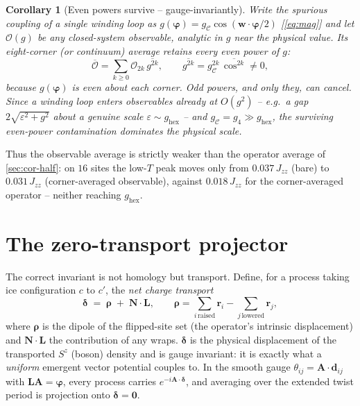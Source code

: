 \documentclass[11pt,letterpaper]{article}
\newcommand{\Jzz}{J_{zz}}
\newcommand{\bvarphi}{\bm{\varphi}}
\newcommand{\bw}{\mathbf{w}}
\newcommand{\bN}{\mathbf{N}}
\newcommand{\br}{\mathbf{r}}
\newcommand{\bL}{\mathbf{L}}
\newcommand{\brho}{\bm{\rho}}
\newcommand{\bdelta}{\bm{\delta}}
\newcommand{\gfour}{g_{4}}
\newcommand{\ghex}{g_{\mathrm{hex}}}
\theoremstyle{plain}
\newtheorem{corollary}{Corollary}
\theoremstyle{definition}
\begin{document}
\begin{corollary}[Even powers survive -- gauge-invariantly]
\label{cor:obs}
Write the spurious coupling of a single winding loop as
$g(\bvarphi)=g_{\mathcal C}\cos(\bw\cdot\bvarphi/2)$
[\cref{eq:mag}] and let $\mathcal O(g)$ be any closed-system observable,
analytic in $g$ near the physical value. Its eight-corner (or continuum)
average retains every \emph{even} power of $g$:
\begin{equation}
\overline{\mathcal O}
=\sum_{k\ge0}\mathcal O_{2k}\,\overline{g^{2k}},
\qquad \overline{g^{2k}}=g_{\mathcal C}^{2k}\,\overline{\cos^{2k}}\neq0,
\end{equation}
because $g(\bvarphi)$ is even about each corner. Odd powers, and only
they, can cancel. Since a winding loop enters observables already at
$O(g^2)$ -- e.g.\ a gap $2\sqrt{\varepsilon^2+g^2}$ about a genuine scale
$\varepsilon\sim\ghex$ -- and $g_{\mathcal C}=\gfour\gg\ghex$, the
surviving even-power contamination dominates the physical scale.
\end{corollary}

Thus the observable average is strictly weaker than the operator average
of \cref{sec:cor-half}: on $16$ sites the low-$T$ peak moves only from
$0.037\,\Jzz$ (bare) to $0.031\,\Jzz$ (corner-averaged observable),
against $0.018\,\Jzz$ for the corner-averaged operator -- neither
reaching $\ghex$.

\section{The zero-transport projector}
\label{sec:transport}

The correct invariant is not homology but transport. Define, for a
process taking ice configuration $c$ to $c'$, the \emph{net charge
transport}
\begin{equation}
\bdelta \;=\; \brho \;+\; \bN\cdot\bL,
\qquad
\brho=\sum_{i\,\text{raised}}\br_i-\sum_{j\,\text{lowered}}\br_j ,
\label{eq:delta}
\end{equation}
where $\brho$ is the dipole of the flipped-site set (the operator's
intrinsic displacement) and $\bN\cdot\bL$ the contribution of any wraps.
$\bdelta$ is the physical displacement of the transported $S^z$
(boson) density and is gauge invariant: it is exactly what a
\emph{uniform} emergent vector potential couples to. In the smooth gauge
$\theta_{ij}=\mathbf A\cdot\mathbf d_{ij}$ with $\bL\mathbf
A=\bvarphi$, every process carries $e^{-i\mathbf A\cdot\bdelta}$, and
averaging over the extended twist period is projection onto $\bdelta=\bm
0$.
\end{document}
